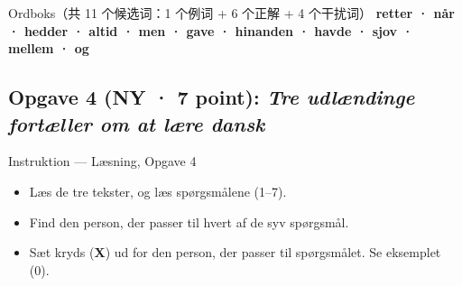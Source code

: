 \begin{tipbox}{Ordboks（共 11 个候选词：1 个例词 + 6 个正解 + 4 个干扰词）}
\centering
\textbf{\color{NCDNavy}retter \quad · \quad når \quad · \quad hedder \quad · \quad altid \quad · \quad men \quad · \quad gave \quad · \quad hinanden \quad · \quad havde \quad · \quad sjov \quad · \quad mellem \quad · \quad og}
\end{tipbox}

\subsection*{Opgave 4 (NY · 7 point): \textit{Tre udlændinge fortæller om at lære dansk}}

\begin{grammatikbox}{Instruktion — Læsning, Opgave 4}
\small
\begin{itemize}
  \item Læs de tre tekster, og læs spørgsmålene (1--7).
  \item Find den person, der passer til hvert af de syv spørgsmål.
  \item Sæt kryds (\textbf{X}) ud for den person, der passer til spørgsmålet. Se eksemplet (0).
\end{itemize}
\end{grammatikbox}

